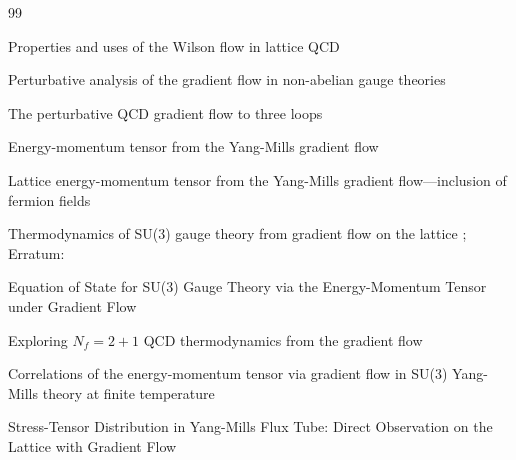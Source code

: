 \begin{thebibliography}{99}

  {Properties and uses of the Wilson flow in lattice QCD}
  {}
  {}

  {Perturbative analysis of the gradient flow in non-abelian gauge theories}
  {}
  {}

  {The perturbative QCD gradient flow to three loops}
  {}
  {}

  {Energy-momentum tensor from the Yang-Mills gradient flow}
  {}
  {}

  {Lattice energy-momentum tensor from the Yang-Mills gradient
  flow---inclusion of fermion fields}
  {}
  {}

  {Thermodynamics of SU(3) gauge theory from gradient flow on the lattice}
  {; Erratum: }
  {}

  {Equation of State for SU(3) Gauge Theory via the Energy-Momentum Tensor under Gradient Flow}
  {}
  {}

  {Exploring $N_{f} = 2+1$ QCD thermodynamics from the gradient flow}
  {}
  {}

  {Correlations of the energy-momentum tensor via gradient flow in SU(3) Yang-Mills theory at finite temperature}
  {}
  {}

  {Stress-Tensor Distribution in Yang-Mills Flux Tube: Direct Observation on the Lattice with Gradient Flow}
  {}
  {}


\end{thebibliography}
